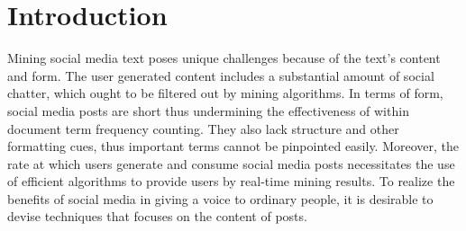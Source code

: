 \documentclass{sig-alternate}
\begin{document}

\newpage
\section{Introduction}




Mining social media text poses unique challenges
because of the text's content and form.
The user generated content includes a substantial 
amount of social chatter, %
which ought to be filtered out by mining algorithms.
In terms of form, social media posts are short thus
undermining the effectiveness of within document 
term frequency counting.
They also lack structure and other formatting cues,
thus important terms cannot be pinpointed easily. 
Moreover, the rate at which users generate and consume
social media posts necessitates the use of efficient algorithms
to provide users by real-time mining results.
To realize the benefits of social media in giving a voice to ordinary people,
it is desirable to devise techniques that focuses on the content of posts.
\end{document}
